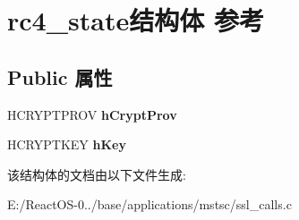\hypertarget{structrc4__state}{}\section{rc4\+\_\+state结构体 参考}
\label{structrc4__state}
\subsection*{Public 属性}
\begin{DoxyCompactItemize}
\item 
\mbox{\label{structrc4__state_ad79fabc3db144c52cf1d3160291431a4}} 
H\+C\+R\+Y\+P\+T\+P\+R\+OV {\bfseries h\+Crypt\+Prov}
\item 
\mbox{\label{structrc4__state_a7873eb600f7537cac40a7726979adff1}} 
H\+C\+R\+Y\+P\+T\+K\+EY {\bfseries h\+Key}
\end{DoxyCompactItemize}


该结构体的文档由以下文件生成\+:\begin{DoxyCompactItemize}
\item 
E\+:/\+React\+O\+S-\/0../base/applications/mstsc/ssl\+\_\+calls.\+c\end{DoxyCompactItemize}
